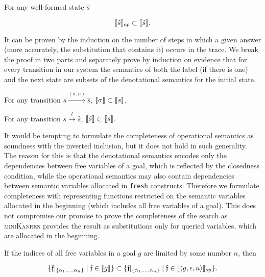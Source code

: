 \begin{lemma}
\label{lem:gen_soundness}
For any well-formed state $\hat{s}$

\[
\llbracket{\hat{s}}\rrbracket_{op} \subset \llbracket{\hat{s}}\rrbracket.
\]
\end{lemma}

It can be proven by the induction on the number of steps in which a given answer (more accurately, the substitution that contains it) occurs in the trace.
We break the proof in two parts and separately prove by induction on evidence that for every transition in our system the semantics of both the label (if there is one)
and the next state are subsets of the denotational semantics for the initial state.

\begin{lemma}
\label{lem:answer_soundness}
For any transition $s \xrightarrow{(\sigma, n)} \hat{s}$, \mbox{$\llbracket{\sigma}\rrbracket \subset \llbracket{s}\rrbracket$}.
\end{lemma}

\begin{lemma}
\label{lem:next_state_soundness}
For any transition $s \xrightarrow{l} \hat{s}$, \mbox{$\llbracket{\hat{s}}\rrbracket \subset \llbracket{s}\rrbracket$}.
\end{lemma}

It would be tempting to formulate the completeness of operational semantics as soundness with the inverted inclusion, but it does not hold in such generality.
The reason for this is that the denotational semantics encodes only the dependencies between free variables of a goal, which is reflected by the closedness condition,
while the operational semantics may also contain dependencies between semantic variables allocated in \lstinline|fresh| constructs. Therefore we formulate completeness
with representing functions restricted on the semantic variables allocated in the beginning (which includes all free variables of a goal). This does not
compromise our promise to prove the completeness of the search as \textsc{miniKanren} provides the result as substitutions only for queried variables,
which are allocated in the beginning.

\begin{theorem}
If the indices of all free variables in a goal $g$ are limited by some number $n$, then

\[
\{\mathfrak{f}|_{\{\alpha_1,\dots,\alpha_n\}} \mid \mathfrak{f} \in \llbracket{g}\rrbracket\} \subset \{\mathfrak{f}|_{\{\alpha_1,\dots,\alpha_n\}} \mid \mathfrak{f} \in \llbracket{\left<{g, \epsilon, n}\right>}\rrbracket_{op}\}.
\]
\end{theorem}


